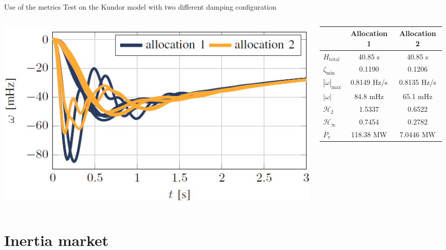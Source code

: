 \documentclass[aspectratio=169, 12pt]{beamer}
\begin{document}
\begin{frame}{Use of the metrics}
  Test on the Kundor model with two different damping configuration
  \begin{columns}
    \begin{column}{0.5\columnwidth}
      \includegraphics[width = \columnwidth]{figure/kundor_frequency.png}
    \end{column}
    \begin{column}{0.5\columnwidth}
      \begin{table}[h!]
        \centering
        \begin{tabular}{lcc}
        \toprule
        & Allocation 1 & Allocation 2 \\
        \midrule
        $H_{\text{total}}$ & 40.85 s & 40.85 s \\
        $\zeta_{\text{min}}$ & 0.1190 & 0.1206 \\
        $\left|\dot{\omega}\right|_{\max}$ & 0.8149 Hz/s & 0.8135 Hz/s \\
        $\left|\omega\right|$ & 84.8 mHz & 65.1 mHz \\
        $\mathcal{H}_2 $ & 1.5337 & 0.6522 \\
        $\mathcal{H}_{\infty} $ & 0.7454 & 0.2782 \\
        $\overline{P}_v$ & 118.38 MW & 7.0446 MW \\
        \bottomrule
        \end{tabular}
      
        \label{table:allocations}
        \end{table}
    \end{column}
  \end{columns}
\end{frame}

\section{Inertia market}  
\begin{frame}
  
\end{frame}
\end{document}
